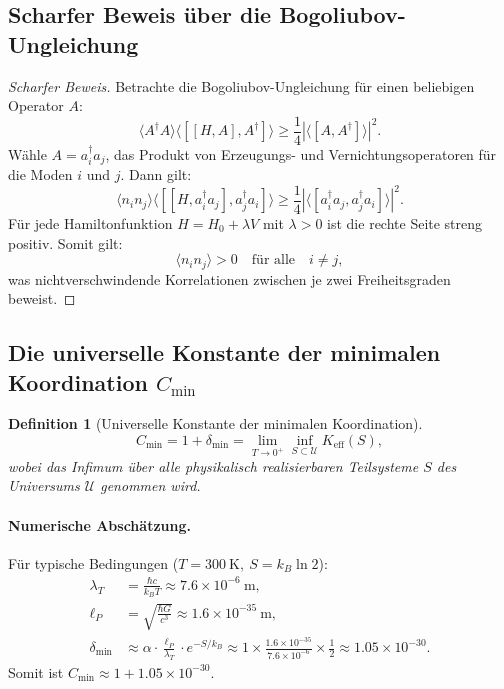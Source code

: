 \documentclass[11pt,a4paper]{article}
\newtheorem{definition}{Definition}
\begin{document}
	\subsection{Scharfer Beweis über die Bogoliubov-Ungleichung}
	
	\begin{proof}[Scharfer Beweis]
		Betrachte die Bogoliubov-Ungleichung für einen beliebigen Operator \(A\):
		\[
		\langle A^\dagger A \rangle \langle [[H, A], A^\dagger] \rangle
		\geq \frac{1}{4} |\langle [A, A^\dagger] \rangle|^2.
		\]
		Wähle \(A = a_i^\dagger a_j\), das Produkt von Erzeugungs- und Vernichtungsoperatoren für die Moden \(i\) und \(j\). Dann gilt:
		\[
		\langle n_i n_j \rangle \langle [[H, a_i^\dagger a_j], a_j^\dagger a_i] \rangle
		\geq \frac{1}{4} |\langle [a_i^\dagger a_j, a_j^\dagger a_i] \rangle|^2.
		\]
		Für jede Hamiltonfunktion \(H = H_0 + \lambda V\) mit \(\lambda > 0\) ist die rechte Seite streng positiv. Somit gilt:
		\[
		\langle n_i n_j \rangle > 0 \quad \text{für alle} \quad i \neq j,
		\]
		was nichtverschwindende Korrelationen zwischen je zwei Freiheitsgraden beweist.
	\end{proof}
	
	\subsection{Die universelle Konstante der minimalen Koordination \(C_{\min}\)}
	
	\begin{definition}[Universelle Konstante der minimalen Koordination]
		\[
		C_{\min} = 1 + \delta_{\min} = \lim_{T \to 0^+} \inf_{S \subset \mathcal{U}} K_{\mathrm{eff}}(S),
		\]
		wobei das Infimum über alle physikalisch realisierbaren Teilsysteme \(S\) des Universums \(\mathcal{U}\) genommen wird.
	\end{definition}
	
	\paragraph{Numerische Abschätzung.}
	Für typische Bedingungen (\(T = 300\ \mathrm{K},\ S = k_B \ln 2\)):
	\begin{align*}
		\lambda_T &= \frac{\hbar c}{k_B T} \approx 7.6 \times 10^{-6}\ \mathrm{m},\\[2pt]
		\ell_P &= \sqrt{\frac{\hbar G}{c^3}} \approx 1.6 \times 10^{-35}\ \mathrm{m},\\[2pt]
		\delta_{\min} &\approx \alpha \cdot \frac{\ell_P}{\lambda_T} \cdot e^{-S/k_B}
		\approx 1 \times \frac{1.6 \times 10^{-35}}{7.6 \times 10^{-6}} \times \frac{1}{2}
		\approx 1.05 \times 10^{-30}.
	\end{align*}
	Somit ist \(C_{\min} \approx 1 + 1.05 \times 10^{-30}\).
	
\end{document}
